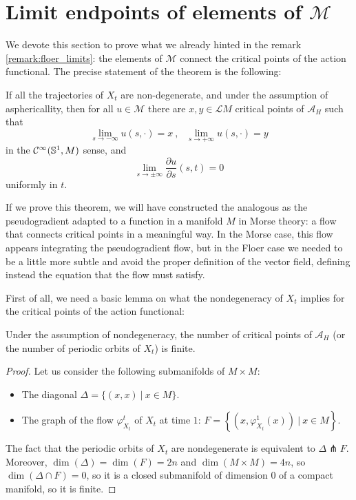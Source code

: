 \section{Limit endpoints of elements of $\mathcal{M}$}

We devote this section to prove what we already hinted in the remark \ref{remark:floer_limits}: the elements of $\mathcal{M}$ connect the critical points of the action functional. The precise statement of the theorem is the following:

\begin{theo} \label{theo:floer_endpoints}
If all the trajectories of $X_t$ are non-degenerate, and under the assumption of asphericallity, then for all $u \in \mathcal{M}$ there are $x, y \in \mathcal{L}M$ critical points of $\mathcal{A}_H$ such that
\[\lim_{s\rightarrow - \infty} u(s,\cdot) = x \ , \ \ \ \lim_{s\rightarrow +\infty} u(s,\cdot) = y\]
in the $\mathcal{C}^{\infty}(\mathbb{S}^1,M)$ sense, and
\[\lim_{s\rightarrow \pm\infty} \frac{\partial u}{\partial s} (s,t) = 0\]
uniformly in $t$.
\end{theo}

If we prove this theorem, we will have constructed the analogous as the pseudogradient adapted to a function in a manifold $M$ in Morse theory: a flow that connects critical points in a meaningful way. In the Morse case, this flow appears integrating the pseudogradient flow, but in the Floer case we needed to be a little more subtle and avoid the proper definition of the vector field, defining instead the equation that the flow must satisfy.

First of all, we need a basic lemma on what the nondegeneracy of $X_t$ implies for the critical points of the action functional:

\begin{lema} \label{lema:floer_finite}
Under the assumption of nondegeneracy, the number of critical points of $\mathcal{A}_H$ (or the number of periodic orbits of $X_t$) is finite.
\end{lema}

\begin{proof}
Let us consider the following submanifolds of $M\times M$:
\begin{itemize}
	\item The diagonal $\Delta = \{(x,x) \ | \ x \in M\}$.
	\item The graph of the flow $\varphi_{X_t}^t$ of $X_t$ at time $1$: $F = \left\{\left(x,\varphi_{X_t}^1(x)\right) \ | \ x \in M\right\}$.
\end{itemize}
The fact that the periodic orbits of $X_t$ are nondegenerate is equivalent to $\Delta \pitchfork F$. Moreover, $\dim(\Delta) = \dim(F) = 2n$ and $\dim(M\times M) = 4n$, so $\dim(\Delta \cap F) = 0$, so it is a closed submanifold of dimension $0$ of a compact manifold, so it is finite.
\end{proof}

